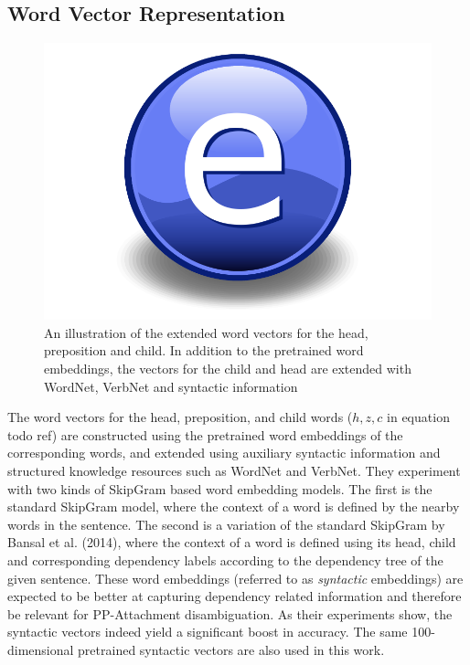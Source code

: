 \subsection{Word Vector Representation}

\begin{figure}
    \centering
    \includegraphics{Figures/Electron.pdf}
    \caption{An illustration of the extended word vectors for the head, preposition and child. In addition to the pretrained word embeddings, the vectors for the child and head are extended with WordNet, VerbNet and syntactic information}
    \label{fig:hpcdvectors}
\end{figure}

The word vectors for the head, preposition, and child words ($h, z, c$ in equation todo ref) are constructed using the pretrained word embeddings of the corresponding words, and extended using auxiliary syntactic information and structured knowledge resources such as WordNet and VerbNet. They experiment with two kinds of SkipGram based word embedding models. The first is the standard SkipGram model, where the context of a word is defined by the nearby words in the sentence. The second is a variation of the standard SkipGram by Bansal et al. (2014), where the context of a word is defined using its head, child and corresponding dependency labels according to the dependency tree of the given sentence. These word embeddings (referred to as \textit{syntactic} embeddings) are expected to be better at capturing dependency related information and therefore be relevant for PP-Attachment disambiguation. As their experiments show, the syntactic vectors indeed yield a significant boost in accuracy. The same 100-dimensional pretrained syntactic vectors are also used in this work. 

